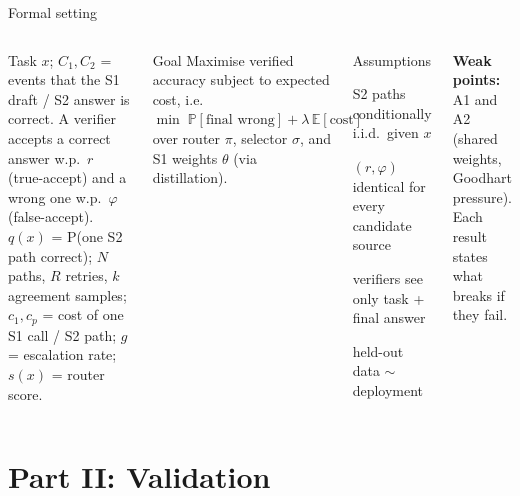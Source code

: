\documentclass[aspectratio=169,10pt]{beamer}
\renewcommand{\Pr}{\mathbb{P}}
\newcommand{\E}{\mathbb{E}}
\begin{document}
\begin{frame}{Formal setting}
\begin{columns}[T]
\begin{definition}[Objects]\small
Task $x$; $C_1,C_2$ = events that the S1 draft / S2 answer is correct.
A verifier accepts a correct answer w.p.\ $r$ (true-accept) and a wrong one w.p.\ $\varphi$ (false-accept).
$q(x)$ = P(one S2 path correct); $N$ paths, $R$ retries, $k$ agreement samples; $c_1,c_p$ = cost of one S1 call / S2 path; $g$ = escalation rate; $s(x)$ = router score.
\end{definition}
\begin{block}{Goal}\small
Maximise verified accuracy subject to expected cost, i.e.
$\min\; \Pr[\text{final wrong}] + \lambda\,\E[\text{cost}]$ over router $\pi$, selector $\sigma$, and S1 weights $\theta$ (via distillation).
\end{block}
\begin{alertblock}{Assumptions}
\small
\begin{description}\setlength{\itemsep}{1pt}
\item[A1] S2 paths conditionally i.i.d.\ given $x$
\item[A2] $(r,\varphi)$ identical for every candidate source
\item[A3] verifiers see only task + final answer
\item[A4] held-out data $\sim$ deployment
\end{description}
\end{alertblock}
\small
\textbf{Weak points:} A1 and A2 (shared weights, Goodhart pressure). Each result states what breaks if they fail.
\end{columns}
\end{frame}

\section{Part II: Validation}
\end{document}
